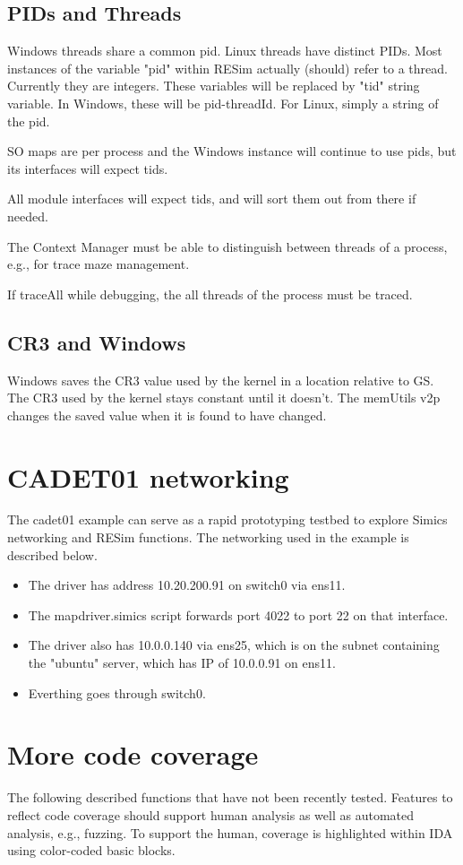 \documentclass[titlepage]{article}
\begin{document}
\begin{appendices}
\subsection{PIDs and Threads}
Windows threads share a common pid. Linux threads have distinct PIDs.
Most instances of the variable "pid" within RESim actually (should) refer to a thread.
Currently they are integers.
These variables will be replaced by "tid" string variable.  In Windows, these will
be pid-threadId.  For Linux, simply a string of the pid.

SO maps are per process and the Windows instance will continue to use pids, but its
interfaces will expect tids.

All module interfaces will expect tids, and will sort them out from there if needed.

The Context Manager must be able to distinguish between threads of a process, e.g., for trace maze management.

If traceAll while debugging, the all threads of the process must be traced.

\subsection{CR3 and Windows}
Windows saves the CR3 value used by the kernel in a location relative to GS.
The CR3 used by the kernel stays constant until it doesn't.  The memUtils v2p
changes the saved value when it is found to have changed. 

\section{CADET01 networking}
The cadet01 example can serve as a rapid prototyping testbed to explore Simics networking and RESim functions.
The networking used in the example is described below.
\begin{itemize}
\item The driver has address 10.20.200.91 on switch0 via ens11.  
\item The mapdriver.simics script forwards port 4022 to
port 22 on that interface.  
\item The driver also has 10.0.0.140 via ens25, which is on the subnet containing the
"ubuntu" server, which has IP of 10.0.0.91 on ens11.  
\item Everthing goes through switch0.
\end{itemize}

\section{More code coverage}
The following described functions that have not been recently tested.
Features to reflect code coverage should support human analysis as well as automated analysis, e.g., fuzzing.  To support the human, coverage is highlighted within IDA using color-coded basic blocks.  


\end{appendices}
\end{document}
